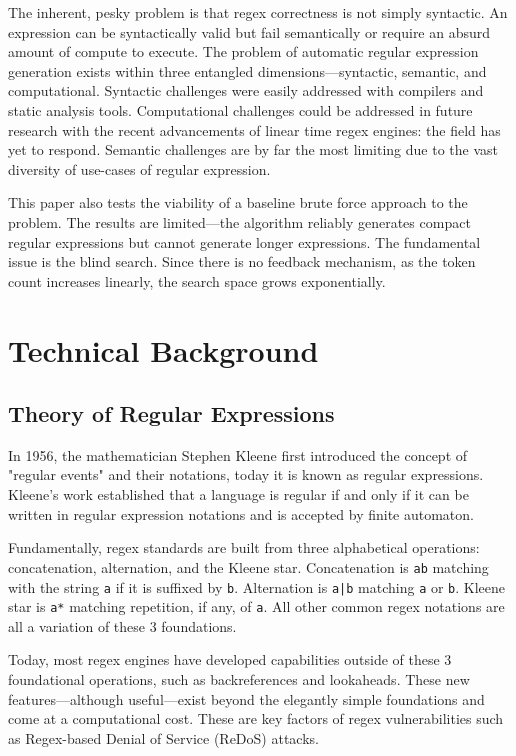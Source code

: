 \documentclass[10pt,twocolumn]{article}
\begin{document}
The inherent, pesky problem is that regex correctness is not simply syntactic. An expression can be syntactically valid but fail semantically or require an absurd amount of compute to execute. The problem of automatic regular expression generation exists within three entangled dimensions—syntactic, semantic, and computational. Syntactic challenges were easily addressed with compilers and static analysis tools. Computational challenges could be addressed in future research with the recent advancements of linear time regex engines: the field has yet to respond. Semantic challenges are by far the most limiting due to the vast diversity of use-cases of regular expression.

This paper also tests the viability of a baseline brute force approach to the problem. The results are limited—the algorithm reliably generates compact regular expressions but cannot generate longer expressions. The fundamental issue is the blind search. Since there is no feedback mechanism, as the token count increases linearly, the search space grows exponentially.

\section{Technical Background}

\subsection{Theory of Regular Expressions}

In 1956, the mathematician Stephen Kleene first introduced the concept of "regular events" and their notations, today it is known as regular expressions\cite{kleene1956}. Kleene's work established that a language is regular if and only if it can be written in regular expression notations and is accepted by finite automaton.

Fundamentally, regex standards are built from three alphabetical operations: concatenation, alternation, and the Kleene star. Concatenation is \texttt{ab} matching with the string \texttt{a} if it is suffixed by \texttt{b}. Alternation is \texttt{a|b} matching \texttt{a} or \texttt{b}. Kleene star is \texttt{a*} matching repetition, if any, of \texttt{a}. All other common regex notations are all a variation of these 3 foundations.

Today, most regex engines have developed capabilities outside of these 3 foundational operations, such as backreferences and lookaheads. These new features—although useful—exist beyond the elegantly simple foundations and come at a computational cost. These are key factors of regex vulnerabilities such as Regex-based Denial of Service (ReDoS) attacks.
\end{document}
